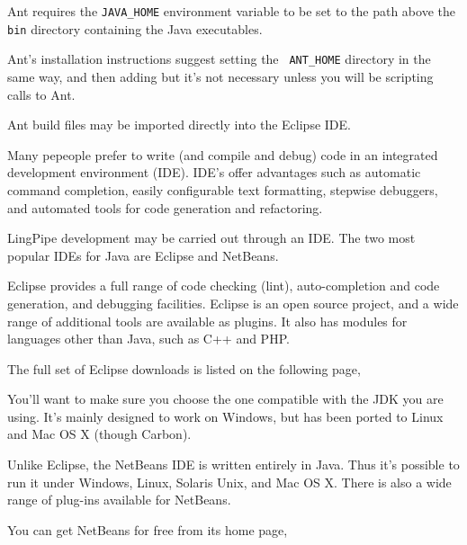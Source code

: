 Ant requires the {\tt JAVA\_HOME} environment variable to be set to
the path above the {\tt bin} directory containing the Java
executables.  

Ant's installation instructions suggest setting the {\tt
ANT\_HOME} directory in the same way, and then adding but it's not necessary unless
you will be scripting calls to Ant.

Ant build files may be imported directly into the Eclipse IDE.



\noindent
Many pepeople prefer to write (and compile and debug) code in an
integrated development environment (IDE).  IDE's offer advantages such
as automatic command completion, easily configurable text formatting,
stepwise debuggers, and automated tools for code generation and
refactoring.  

LingPipe development may be carried out through an IDE.  The two most
popular IDEs for Java are Eclipse and NetBeans.


\noindent
Eclipse provides a full range of code checking (lint), auto-completion
and code generation, and debugging facilities.  Eclipse is an open source
project, and a wide range of additional tools are available as plugins.  It
also has modules for languages other than Java, such as C++ and PHP.

The full set of Eclipse downloads is listed on the following page,
%
\begin{quote}
\end{quote}

You'll want to make sure you choose the one compatible with the JDK
you are using.  It's mainly designed to work on Windows, but has been
ported to Linux and Mac OS X (though Carbon).



\noindent
Unlike Eclipse, the NetBeans IDE is written entirely in Java.  Thus
it's possible to run it under Windows, Linux, Solaris Unix, and Mac OS
X. There is also a wide range of plug-ins available for NetBeans.

You can get NetBeans for free from its home page,
%
\begin{quote}
\end{quote}
%



